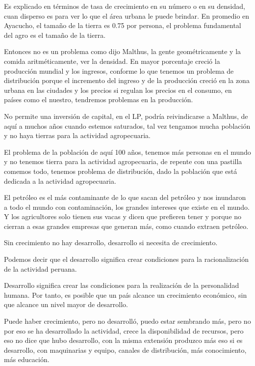 \documentclass[
  a4paper,
]{article}
\begin{document}
Es explicado en términos de tasa de crecimiento en su número o en su
densidad, cuan disperso es para ver lo que el área urbana le puede
brindar. En promedio en Ayacucho, el tamaño de la tierra es 0.75 por
persona, el problema fundamental del agro es el tamaño de la tierra.

Entonces no es un problema como dijo Malthus, la gente geométricamente y
la comida aritméticamente, ver la densidad. En mayor porcentaje creció
la producción mundial y los ingresos, conforme lo que tenemos un
problema de distribución porque el incremento del ingreso y de la
producción creció en la zona urbana en las ciudades y los precios si
regulan los precios en el consumo, en países como el nuestro, tendremos
problemas en la producción.

No permite una inversión de capital, en el LP, podría reivindicarse a
Malthus, de aquí a muchos años cuando estemos saturados, tal vez
tengamos mucha población y no haya tierras para la actividad
agropecuaria.

El problema de la población de aquí 100 años, tenemos más personas en el
mundo y no tenemos tierra para la actividad agropecuaria, de repente con
una pastilla comemos todo, tenemos problema de distribución, dado la
población que está dedicada a la actividad agropecuaria.

El petróleo es el más contaminante de lo que sacan del petróleo y nos
inundaron a todo el mundo con contaminación, los grandes intereses que
existe en el mundo. Y los agricultores solo tienen sus vacas y dicen que
prefieren tener y porque no cierran a esas grandes empresas que generan
más, como cuando extraen petróleo.

Sin crecimiento no hay desarrollo, desarrollo si necesita de
crecimiento.

Podemos decir que el desarrollo significa crear condiciones para la
racionalización de la actividad peruana.

Desarrollo significa crear las condiciones para la realización de la
personalidad humana. Por tanto, es posible que un país alcance un
crecimiento económico, sin que alcance un nivel mayor de desarrollo.

Puede haber crecimiento, pero no desarrolló, puedo estar sembrando más,
pero no por eso se ha desarrollado la actividad, crece la disponibilidad
de recursos, pero eso no dice que hubo desarrollo, con la misma
extensión produzco más eso si es desarrollo, con maquinarias y equipo,
canales de distribución, más conocimiento, más educación.
\end{document}
